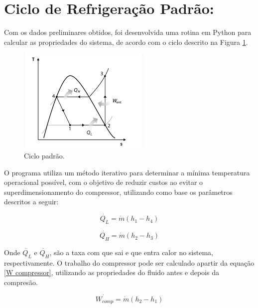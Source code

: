 \newpage

\section{Ciclo de Refrigeração Padrão:}

Com os dados preliminares obtidos, foi desenvolvida uma rotina em Python para calcular as propriedades do sistema, de acordo com o ciclo descrito na Figura \ref{fig:ciclo padrão}. 

\begin{figure}[ht]
    \centering
    \includegraphics[width=0.6\linewidth]{Imagens/Desenvolvimento/Diagrama.png}
    \caption{Ciclo padrão.}
    \label{fig:ciclo padrão}
\end{figure}

\newpage

O programa utiliza um método iterativo para determinar a  mínima temperatura operacional possível, com o objetivo de reduzir custos ao evitar o superdimensionamento do compressor, utilizando como base os parâmetros descritos a seguir:

\begin{equation}
    \dot{Q_L} = \dot{m}(h_1-h_4)
    \label{QL}
\end{equation}

\begin{equation}
    \dot{Q_H} = \dot{m}(h_2-h_3)
    \label{QH}
\end{equation}

    Onde $\dot{Q_L}$ e $\dot{Q_H}$, são  a taxa com que sai e que entra calor no sistema, respectivamente. O trabalho do compressor pode ser calculado apartir da equação \ref{W compressor}, utilizando as propriedades do fluido antes e depois da compresão.

\begin{equation}
    \dot{W_{comp}} = \dot{m}(h_2-h_1)
    \label{W compressor}
\end{equation}

